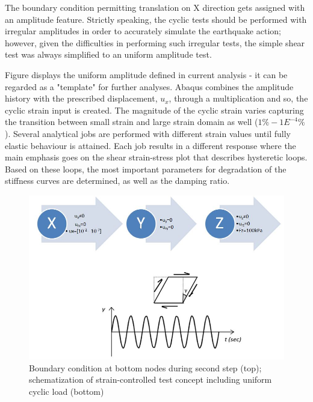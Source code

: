 \documentclass[12pt,a4paper]{report}
\begin{document}
The boundary condition permitting translation on X direction gets assigned with an amplitude feature. Strictly speaking, the cyclic tests should be performed with irregular amplitudes in order to accurately simulate the earthquake action; however, given the difficulties in performing such irregular tests, the simple shear test was always simplified to an uniform amplitude test. 

Figure \label{Figure 16} displays the uniform amplitude defined in current analysis - it can be regarded as a "template" for further analyses. Abaqus combines the amplitude history with the prescribed displacement, $u_x$, through a multiplication and so, the cyclic strain input is created. The magnitude of the cyclic strain varies capturing the transition between small strain and large strain domain as well ($1\% -  1E^{-4}\%$). Several analytical jobs are performed with different strain values until fully elastic behaviour is attained. Each job results in a different response where the main emphasis goes on the shear strain-stress plot that describes hysteretic loops. Based on these loops, the most important parameters for degradation of the stiffness curves are determined, as well as the damping ratio.
\begin{figure}[h!]
	\centering
	\includegraphics[width=0.7\linewidth]{"bc1d2"}
	\caption{Boundary condition at bottom nodes during second step (top); schematization of strain-controlled test concept including uniform cyclic load (bottom)}
	\label{strain-test}
\end{figure}
\end{document}

